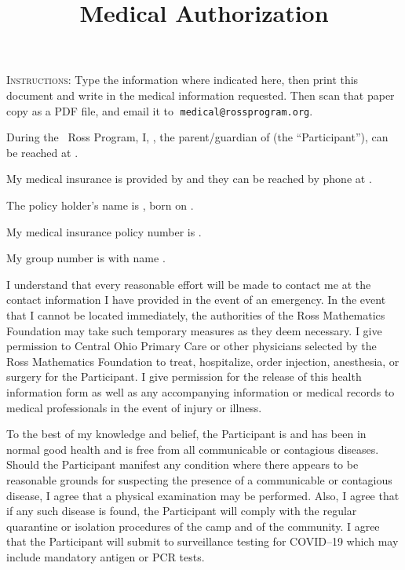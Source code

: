 \documentclass{ross}
\title{Medical Authorization}
\begin{document}
\maketitle

\textsc{Instructions:} Type the information where indicated here, then print this document and write in the medical information requested. Then scan that paper copy as a PDF file, and email it to$\;$ \texttt{medical@rossprogram.org}.

During the \the\year\ Ross Program, I, , the parent/guardian of  (the ``Participant''), can be reached at .

My medical insurance is provided by  and they can be reached by phone at .

The policy holder's name is , born on .

My medical insurance policy number is .

My group number is  with name .

I understand that every reasonable effort will be made to contact me
at the contact information I have provided in the event of an
emergency.  In the event that I cannot be located immediately, the
authorities of the Ross Mathematics Foundation may take such temporary
measures as they deem necessary.  I give permission to Central Ohio
Primary Care or other physicians selected by the Ross Mathematics
Foundation to treat, hospitalize, order injection, anesthesia, or surgery
for the Participant.  I give permission for the release of this health
information form as well as any accompanying information or medical
records to medical professionals in the event of injury or illness.

To the best of my knowledge and belief, the Participant is and has
been in normal good health and is free from all communicable or
contagious diseases. Should the Participant manifest any condition
where there appears to be reasonable grounds for suspecting the
presence of a communicable or contagious disease, I agree that a
physical examination may be performed. Also, I agree that if any such
disease is found, the Participant will comply with the regular
quarantine or isolation procedures of the camp and of the community.
I agree that the Participant will submit to surveillance testing for
COVID--19 which may include mandatory antigen or PCR tests.
\end{document}

